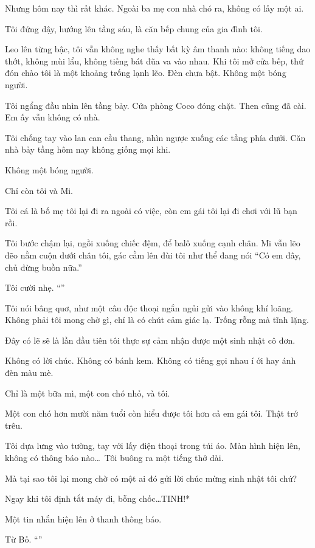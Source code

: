 \documentclass[../main.tex]{subfiles}
\begin{document}
Nhưng hôm nay thì rất khác. Ngoài ba mẹ con nhà chó ra, không có lấy một ai.

Tôi đứng dậy, hướng lên tầng sáu, là căn bếp chung của gia đình tôi.

Leo lên từng bậc, tôi vẫn không nghe thấy bất kỳ âm thanh nào: không tiếng dao thớt, không mùi lẩu, không tiếng bát đũa va vào nhau. Khi tôi mở cửa bếp, thứ đón chào tôi là một khoảng trống lạnh lẽo. Đèn chưa bật. Không một bóng người.

Tôi ngẩng đầu nhìn lên tầng bảy. Cửa phòng Coco đóng chặt. Then cũng đã cài. Em ấy vẫn không có nhà.

Tôi chống tay vào lan can cầu thang, nhìn ngược xuống các tầng phía dưới. Căn nhà bảy tầng hôm nay không giống mọi khi.

Không một bóng người.

Chỉ còn tôi và Mi.

Tôi cá là bố mẹ tôi lại đi ra ngoài có việc, còn em gái tôi lại đi chơi với lũ bạn rồi.

Tôi bước chậm lại, ngồi xuống chiếc đệm, để balô xuống cạnh chân. Mi vẫn lẽo đẽo nằm cuộn dưới chân tôi, gác cằm lên đùi tôi như thể đang nói ``Có em đây, chủ đừng buồn nữa.''

Tôi cười nhẹ. ``''

Tôi nói bâng quơ, như một câu độc thoại ngắn ngủi gửi vào không khí loãng. Không phải tôi mong chờ gì, chỉ là có chút cảm giác lạ. Trống rỗng mà tĩnh lặng.

Đây có lẽ sẽ là lần đầu tiên tôi thực sự cảm nhận được một sinh nhật cô đơn.

Không có lời chúc. Không có bánh kem. Không có tiếng gọi nhau í ới hay ánh đèn màu mè.

Chỉ là một bữa mì, một con chó nhỏ, và tôi.

Một con chó hơn mười năm tuổi còn hiểu được tôi hơn cả em gái tôi. Thật trớ trêu.

Tôi dựa lưng vào tường, tay với lấy điện thoại trong túi áo. Màn hình hiện lên, không có thông báo nào\dots\ Tôi buông ra một tiếng thở dài.

Mà tại sao tôi lại mong chờ có một ai đó gửi lời chúc mừng sinh nhật tôi chứ?

Ngay khi tôi định tắt máy đi, bỗng chốc\dots *TINH!*

Một tin nhắn hiện lên ở thanh thông báo.

Từ Bố. ``''
\end{document}
